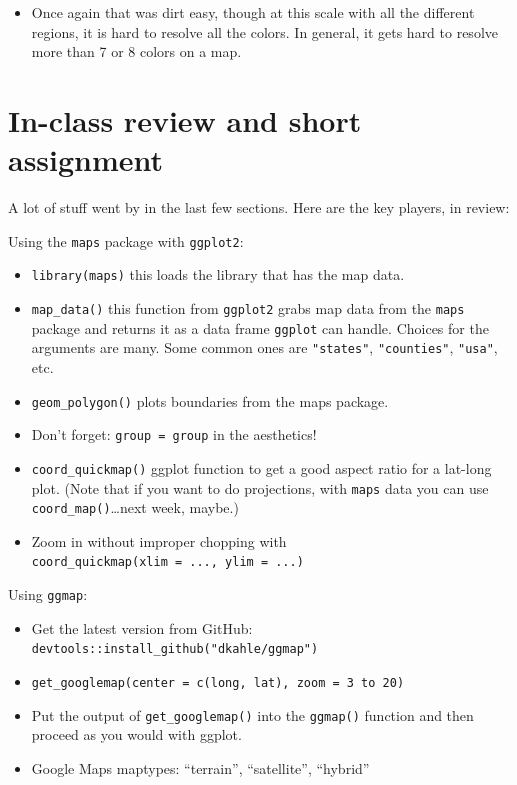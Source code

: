 \documentclass[]{book}
\providecommand{\tightlist}{%
  \setlength{\itemsep}{0pt}\setlength{\parskip}{0pt}}
\theoremstyle{definition}
\theoremstyle{definition}
\theoremstyle{remark}
\begin{document}
\begin{itemize}
\tightlist
\item
  Once again that was dirt easy, though at this scale with all the
  different regions, it is hard to resolve all the colors. In general,
  it gets hard to resolve more than 7 or 8 colors on a map.
\end{itemize}

\section{In-class review and short
assignment}\label{in-class-review-and-short-assignment}

A lot of stuff went by in the last few sections. Here are the key
players, in review:

Using the \texttt{maps} package with \texttt{ggplot2}:

\begin{itemize}
\tightlist
\item
  \texttt{library(maps)} this loads the library that has the map data.
\item
  \texttt{map\_data()} this function from \texttt{ggplot2} grabs map
  data from the \texttt{maps} package and returns it as a data frame
  \texttt{ggplot} can handle. Choices for the arguments are many. Some
  common ones are \texttt{"states"}, \texttt{"counties"},
  \texttt{"usa"}, etc.
\item
  \texttt{geom\_polygon()} plots boundaries from the maps package.
\item
  Don't forget: \texttt{group\ =\ group} in the aesthetics!
\item
  \texttt{coord\_quickmap()} ggplot function to get a good aspect ratio
  for a lat-long plot. (Note that if you want to do projections, with
  \texttt{maps} data you can use \texttt{coord\_map()}\ldots{}next week,
  maybe.)
\item
  Zoom in without improper chopping with
  \texttt{coord\_quickmap(xlim\ =\ ...,\ ylim\ =\ ...)}
\end{itemize}

Using \texttt{ggmap}:

\begin{itemize}
\tightlist
\item
  Get the latest version from GitHub:
  \texttt{devtools::install\_github("dkahle/ggmap")}
\item
  \texttt{get\_googlemap(center\ =\ c(long,\ lat),\ zoom\ =\ 3\ to\ 20)}
\item
  Put the output of \texttt{get\_googlemap()} into the \texttt{ggmap()}
  function and then proceed as you would with ggplot.
\item
  Google Maps maptypes: ``terrain'', ``satellite'', ``hybrid''
\end{itemize}
\end{document}
